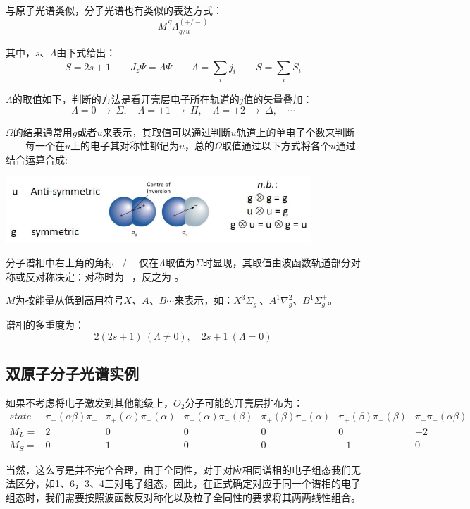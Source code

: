 与原子光谱类似，分子光谱也有类似的表达方式：
\[M^S\Lambda^{(+/-)}_{g/u}\]

其中，$s$、$\Lambda$由下式给出：
\[S=2s+1 \qquad \hat{J}_z\varPsi=\Lambda\varPsi \qquad \Lambda=\sum_ij_i \qquad S=\sum_iS_i\]

$\Lambda$的取值如下，判断的方法是看开壳层电子所在轨道的$j$值的矢量叠加：
\[\Lambda=0 \ \rightarrow \ \Sigma, \quad \Lambda=\pm 1 \ \rightarrow \ \Pi, \quad \Lambda=\pm 2 \ \rightarrow \ \Delta, \quad \cdots\]

$\Omega$的结果通常用$g$或者$u$来表示，其取值可以通过判断$u$轨道上的单电子个数来判断——每一个在$u$上的电子其对称性都记为$u$，总的$\Omega$取值通过以下方式将各个$u$通过结合运算合成:
\begin{center}
    \includegraphics{fig/lzhx/微信图片_20211106011930.png}
\end{center}

分子谱相中右上角的角标$+/-$仅在$\Lambda$取值为$\Sigma$时显现，其取值由波函数轨道部分对称或反对称决定：对称时为+，反之为-。

$M$为按能量从低到高用符号$X$、$A$、$B$$\cdots$来表示，如：$X^3\Sigma^-_g$、$A^1\nabla^2_g$、$B^1\Sigma^+_g$。

谱相的多重度为：
\[2(2s+1) \ (\Lambda \neq 0), \quad 2s+1 \ (\Lambda = 0)\]

\subsection{双原子分子光谱实例}
如果不考虑将电子激发到其他能级上，$O_2$分子可能的开壳层排布为：
\[
    \begin{array}{lcccccc}
        state & \pi_+(\alpha\beta)\pi_- & \pi_+(\alpha)\pi_-(\alpha) & \pi_+(\alpha)\pi_-(\beta) & \pi_+(\beta)\pi_-(\alpha) & \pi_+(\beta)\pi_-(\beta) & \pi_+\pi_-(\alpha\beta) \\
        M_L=  & 2 & 0 & 0 & 0 & 0 & -2 \\
        M_S=  & 0 & 1 & 0 & 0 & -1 & 0
    \end{array}
\]

当然，这么写是并不完全合理，由于全同性，对于对应相同谱相的电子组态我们无法区分，如1、6，3、4三对电子组态，因此，在正式确定对应于同一个谱相的电子组态时，我们需要按照波函数反对称化以及粒子全同性的要求将其两两线性组合。

